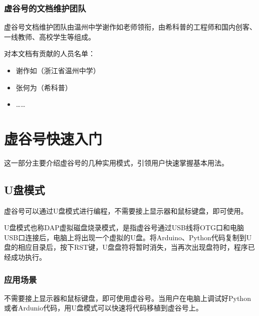 \documentclass[letterpaper,10pt,english]{sphinxmanual}
\begin{document}
\subsection{虚谷号的文档维护团队}
\label{\detokenize{01.about/1.5-docs:id4}}
虚谷号文档维护团队由温州中学谢作如老师领衔，由希科普的工程师和国内创客、一线教师、高校学生等组成。

对本文档有贡献的人员名单：
\begin{itemize}
\item {} 
谢作如（浙江省温州中学）

\item {} 
张何为（希科普）

\item {} 
……

\end{itemize}


\chapter{虚谷号快速入门}
\label{\detokenize{02.quick/index:id1}}\label{\detokenize{02.quick/index::doc}}
这一部分主要介绍虚谷号的几种实用模式，引领用户快速掌握基本用法。


\section{U盘模式}
\label{\detokenize{02.quick/2.1-dap:u}}\label{\detokenize{02.quick/2.1-dap::doc}}
虚谷号可以通过U盘模式进行编程，不需要接上显示器和鼠标键盘，即可使用。

U盘模式也称DAP虚拟磁盘烧录模式，是指虚谷号通过USB线将OTG口和电脑USB口连接后，电脑上将出现一个虚拟的U盘。将Arduino、Python代码复制到U盘的相应目录后，按下RST键，U盘盘符将暂时消失，当再次出现盘符时，程序已经成功执行。


\subsection{应用场景}
\label{\detokenize{02.quick/2.1-dap:id1}}
不需要接上显示器和鼠标键盘，即可使用虚谷号。当用户在电脑上调试好Python或者Ardunio代码，用U盘模式可以快速将代码移植到虚谷号上。
\end{document}
